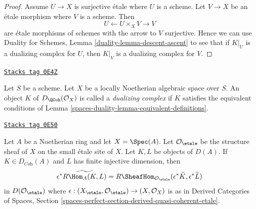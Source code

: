 \begin{proof}
Assume $U \to X$ is surjective \'etale where $U$ is a scheme.
Let $V \to X$ be an \'etale morphism where $V$ is a scheme.
Then
$$
U \leftarrow U \times_X V \rightarrow V
$$
are \'etale morphisms of schemes with the arrow to $V$ surjective.
Hence we can use Duality for Schemes, Lemma \ref{duality-lemma-descent-ascent}
to see that if $K|_U$ is a dualizing complex for $U$, then
$K|_V$ is a dualizing complex for $V$.
\end{proof}

\begin{definition}
\label{spaces-duality-definition-dualizing-scheme}
\href{https://stacks.math.columbia.edu/tag/0E4Z}{\texttt{Stacks tag 0E4Z}}

Let $S$ be a scheme.
Let $X$ be a locally Noetherian algebraic space over $S$.
An object $K$ of $D_\QCoh(\mathcal{O}_X)$ is called a
{\it dualizing complex} if $K$ satisfies the equivalent conditions of
Lemma \ref{spaces-duality-lemma-equivalent-definitions}.
\end{definition}

\begin{lemma}
\label{spaces-duality-lemma-affine-duality}
\href{https://stacks.math.columbia.edu/tag/0E50}{\texttt{Stacks tag 0E50}}

Let $A$ be a Noetherian ring and let $X = \Spec(A)$. Let
$\mathcal{O}_\etale$ be the structure sheaf of $X$ on the
small \'etale site of $X$. Let $K, L$ be objects of $D(A)$.
If $K \in D_{\textit{Coh}}(A)$ and $L$ has finite injective
dimension, then
$$
\epsilon^*\widetilde{R\Hom_A(K, L)} =
R\SheafHom_{\mathcal{O}_\etale}(\epsilon^*\widetilde{K},
\epsilon^*\widetilde{L})
$$
in $D(\mathcal{O}_\etale)$ where
$\epsilon : (X_\etale, \mathcal{O}_\etale) \to (X, \mathcal{O}_X)$
is as in Derived Categories of Spaces, Section
\ref{spaces-perfect-section-derived-quasi-coherent-etale}.
\end{lemma}

